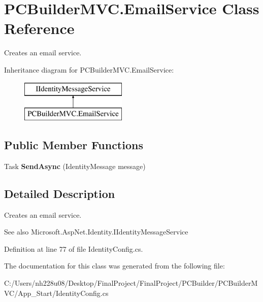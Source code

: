 \hypertarget{class_p_c_builder_m_v_c_1_1_email_service}{}\section{P\+C\+Builder\+M\+V\+C.\+Email\+Service Class Reference}
\label{class_p_c_builder_m_v_c_1_1_email_service}


Creates an email service.  


Inheritance diagram for P\+C\+Builder\+M\+V\+C.\+Email\+Service\+:\begin{figure}[H]
\begin{center}
\leavevmode
\includegraphics[height=2.000000cm]{class_p_c_builder_m_v_c_1_1_email_service}
\end{center}
\end{figure}
\subsection*{Public Member Functions}
\begin{DoxyCompactItemize}
\item 
Task {\bfseries Send\+Async} (Identity\+Message message)\hypertarget{class_p_c_builder_m_v_c_1_1_email_service_a5edc6da9b4227c6f699f71c011c86621}{}\label{class_p_c_builder_m_v_c_1_1_email_service_a5edc6da9b4227c6f699f71c011c86621}

\end{DoxyCompactItemize}


\subsection{Detailed Description}
Creates an email service. 

\begin{DoxySeeAlso}{See also}
Microsoft.\+Asp\+Net.\+Identity.\+I\+Identity\+Message\+Service


\end{DoxySeeAlso}


Definition at line 77 of file Identity\+Config.\+cs.



The documentation for this class was generated from the following file\+:\begin{DoxyCompactItemize}
\item 
C\+:/\+Users/nh228u08/\+Desktop/\+Final\+Project/\+Final\+Project/\+P\+C\+Builder/\+P\+C\+Builder\+M\+V\+C/\+App\+\_\+\+Start/Identity\+Config.\+cs\end{DoxyCompactItemize}
